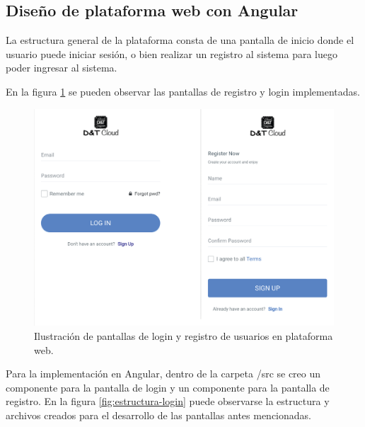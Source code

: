 \subsection{Diseño de plataforma web con Angular}

La estructura general de la plataforma consta de una pantalla de inicio donde el usuario puede iniciar sesión, o bien realizar un registro al sistema para luego poder ingresar al sistema. 

En la figura \ref{fig:pantalla-login} se pueden observar las pantallas de registro y login implementadas. 

\begin{figure}[htpb]
	\centering
	\includegraphics[scale=.75]{./Figures/pantalla-login.png}
	\caption[Pantalla de login y registro]{Ilustración de pantallas de login y registro de usuarios en plataforma web.}
	\label{fig:pantalla-login}
\end{figure}

Para la implementación en Angular, dentro de la carpeta /src se creo un componente para la pantalla de login y un componente para la pantalla de registro. En la figura \ref{fig:estructura-login} puede observarse la estructura y archivos creados para el desarrollo de las pantallas antes mencionadas. 

